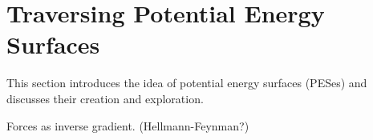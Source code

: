 \section{Traversing Potential Energy Surfaces}
\label{sec:pes}

This section introduces the idea of potential energy surfaces (PESes) and discusses their creation and exploration.


\bit
\item Forces as inverse gradient. (Hellmann-Feynman?)
\eit

\incomplete







